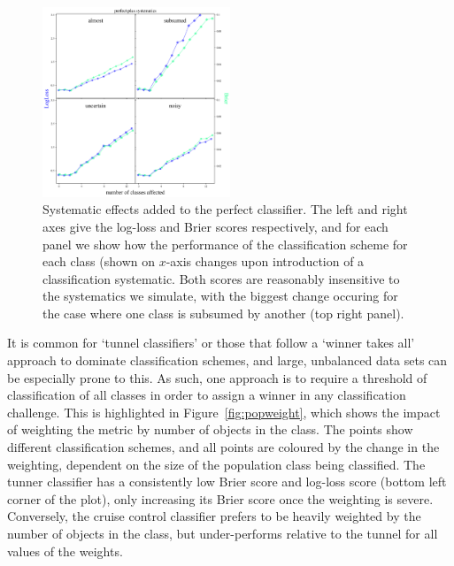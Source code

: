 \begin{figure}
	\begin{center}
		\includegraphics[width=0.5\textwidth]{./fig/systematics_onlyperfect.png}
		\caption{Systematic effects added to the perfect classifier. The left and right axes give the log-loss and Brier scores respectively, and for each panel we show how the performance of the classification scheme for each class (shown on $x$-axis changes upon introduction of a classification systematic. Both scores are reasonably insensitive to the systematics we simulate, with the biggest change occuring for the case where one class is subsumed by another (top right panel).\label{fig:cruise}}
	\end{center}
\end{figure}

It is common for `tunnel classifiers' or those that follow a `winner takes all' approach to dominate classification schemes, and large, unbalanced data sets can be especially prone to this. As such, one approach is to require a threshold of classification of all classes in order to assign a winner in any classification challenge.
This is highlighted in Figure~\ref{fig:popweight}, which shows the impact of weighting the metric by number of objects in the class. The points show different classification schemes, and all points are coloured by the change in the weighting, dependent on the size of the population class being classified. The tunner classifier has a consistently low Brier score and log-loss score (bottom left corner of the plot), only increasing its Brier score once the weighting is severe. Conversely, the cruise control classifier prefers to be heavily weighted by the number of objects in the class, but under-performs relative to the tunnel for all values of the weights.

